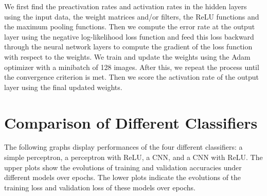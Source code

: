 \documentclass{article}
\begin{document}
We first find the preactivation rates and activation rates in the hidden layers using the input data, the weight matrices and/or filters, the ReLU functions and the maximum pooling functions.  Then we compute the error rate at the output layer using the negative log-likelihood loss function and feed this loss backward through the neural network layers to compute the gradient of the loss function with respect to the weights. We train and update the weights using the Adam optimizer with a minibatch of 128 images. After this, we repeat the process until the convergence criterion is met. Then we score the activation rate of the output layer using the final updated weights.


\section{Comparison of Different Classifiers}

The following graphs display performances of the four different classifiers: a simple perceptron, a perceptron with ReLU, a CNN, and a CNN with ReLU. The upper plots show the evolutions of training and validation accuracies under different models over epochs. The lower plots indicate the evolutions of the training loss and validation loss of these models over epochs.
\smallskip
\end{document}
